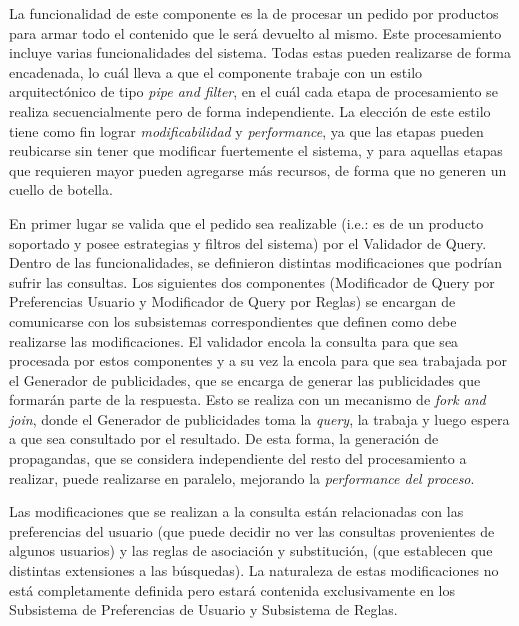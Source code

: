 La funcionalidad de este componente es la de procesar un pedido por productos para armar todo el contenido que le será devuelto al mismo. Este procesamiento incluye varias funcionalidades del sistema. Todas estas pueden realizarse de forma encadenada, lo cuál lleva a que el componente trabaje con un estilo arquitectónico de tipo \emph{pipe and filter}, en el cuál cada etapa de procesamiento se realiza secuencialmente pero de forma independiente. La elección de este estilo tiene como fin lograr \emph{modificabilidad} y \emph{performance}, ya que las etapas pueden reubicarse sin tener que modificar fuertemente el sistema, y para aquellas etapas que requieren mayor pueden agregarse más recursos, de forma que no generen un cuello de botella.

En primer lugar se valida que el pedido sea realizable (i.e.: es de un producto soportado y posee estrategias y filtros del sistema) por el \textsf{Validador de Query}. Dentro de las funcionalidades, se definieron distintas modificaciones que podrían sufrir las consultas. Los siguientes dos componentes (\textsf{Modificador de Query por Preferencias Usuario} y \textsf{Modificador de Query por Reglas}) se encargan de comunicarse con los subsistemas correspondientes que definen como debe realizarse las modificaciones. El validador encola la consulta para que sea procesada por estos componentes y a su vez la encola para que sea trabajada por el \textsf{Generador de publicidades}, que se encarga de generar las publicidades que formarán parte de la respuesta. Esto se realiza con un mecanismo de \emph{fork and join}, donde el \textsf{Generador de publicidades} toma la \emph{query}, la trabaja y luego espera a que sea consultado por el resultado. De esta forma, la generación de propagandas, que se considera independiente del resto del procesamiento a realizar, puede realizarse en paralelo, mejorando la \emph{performance del proceso}.

Las modificaciones que se realizan a la consulta están relacionadas con las preferencias del usuario (que puede decidir no ver las consultas provenientes de algunos usuarios) y las reglas de asociación y substitución, (que establecen que distintas extensiones a las búsquedas). La naturaleza de estas modificaciones no está completamente definida pero estará contenida exclusivamente en los \textsf{Subsistema de Preferencias de Usuario} y \textsf{Subsistema de Reglas}. 

